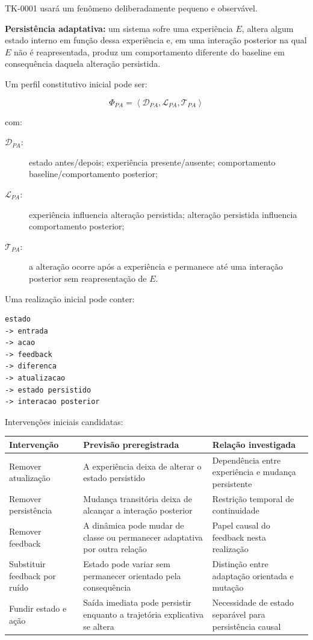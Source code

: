 \documentclass[11pt,a4paper]{article}
\begin{document}
TK-0001 usará um fenômeno deliberadamente pequeno e observável.

\begin{thesisbox}[Fenômeno TK-0001]
\textbf{Persistência adaptativa:}
um sistema sofre uma experiência $E$, altera algum estado interno em função dessa
experiência e, em uma interação posterior na qual $E$ não é reapresentada, produz um
comportamento diferente do baseline em consequência daquela alteração persistida.
\end{thesisbox}

Um perfil constitutivo inicial pode ser:

\[
\Phi_{PA}
=
\left\langle
\mathcal D_{PA},
\mathcal L_{PA},
\mathcal T_{PA}
\right\rangle
\]

com:

\begin{description}
  \item[$\mathcal D_{PA}$:] estado antes/depois; experiência presente/ausente;
  comportamento baseline/comportamento posterior;
  \item[$\mathcal L_{PA}$:] experiência influencia alteração persistida; alteração
  persistida influencia comportamento posterior;
  \item[$\mathcal T_{PA}$:] a alteração ocorre após a experiência e permanece até
  uma interação posterior sem reapresentação de $E$.
\end{description}

Uma realização inicial pode conter:

\begin{lstlisting}
estado
-> entrada
-> acao
-> feedback
-> diferenca
-> atualizacao
-> estado persistido
-> interacao posterior
\end{lstlisting}

Intervenções iniciais candidatas:

\begin{longtable}{p{4.0cm}p{4.8cm}p{5.3cm}}
\toprule
Intervenção & Previsão preregistrada & Relação investigada \\
\midrule
\endhead
Remover atualização &
A experiência deixa de alterar o estado persistido &
Dependência entre experiência e mudança persistente \\

Remover persistência &
Mudança transitória deixa de alcançar a interação posterior &
Restrição temporal de continuidade \\

Remover feedback &
A dinâmica pode mudar de classe ou permanecer adaptativa por outra relação &
Papel causal do feedback nesta realização \\

Substituir feedback por ruído &
Estado pode variar sem permanecer orientado pela consequência &
Distinção entre adaptação orientada e mutação \\

Fundir estado e ação &
Saída imediata pode persistir enquanto a trajetória explicativa se altera &
Necessidade de estado separável para persistência causal \\
\bottomrule
\end{longtable}
\end{document}
